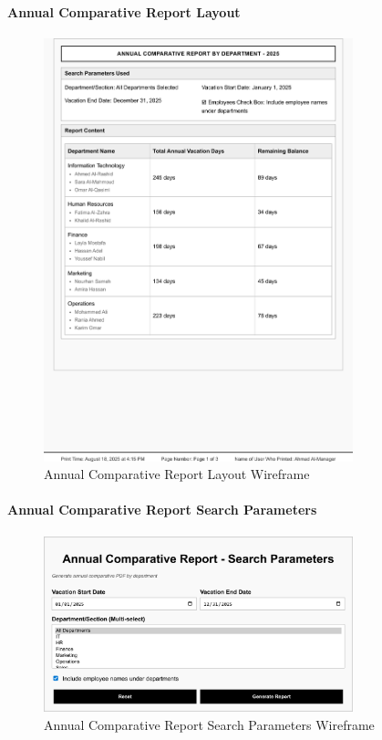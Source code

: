 \documentclass[12pt,a4paper]{article}
\begin{document}
\paragraph{Annual Comparative Report Layout}
\begin{figure}[H]
\centering
\includegraphics[width=0.8\textwidth]{Wireframes/Print-Layout-Annual-Comparative-Report/Print-Layout-Annual-Comparative-Report-Web-1.png}
\caption{Annual Comparative Report Layout Wireframe}
\label{fig:wireframe-annual-comparative-report}
\end{figure}

\paragraph{Annual Comparative Report Search Parameters}
\begin{figure}[H]
\centering
\includegraphics[width=0.8\textwidth]{Wireframes/Annual-Comparative-Report-Search-Parameters/Annual-Comparative-Report-Search-Parameters-1.png}
\caption{Annual Comparative Report Search Parameters Wireframe}
\label{fig:wireframe-annual-comparative-report-search-params}
\end{figure}
\end{document}
